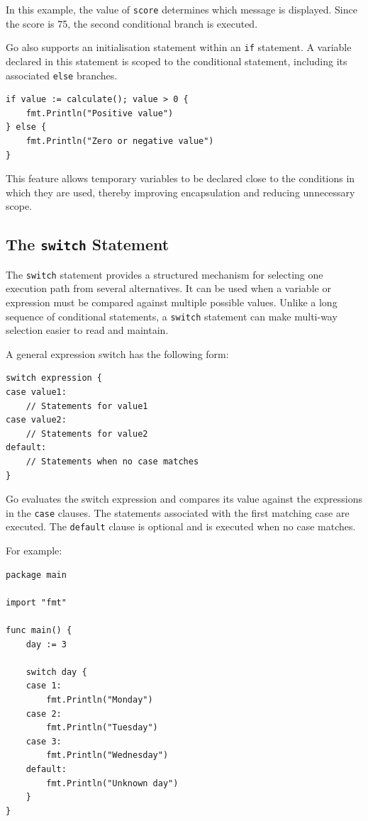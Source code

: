 In this example, the value of \texttt{score} determines which
message is displayed. Since the score is 75, the second
conditional branch is executed.

Go also supports an initialisation statement within an
\texttt{if} statement. A variable declared in this statement
is scoped to the conditional statement, including its
associated \texttt{else} branches.

\begin{lstlisting}
if value := calculate(); value > 0 {
    fmt.Println("Positive value")
} else {
    fmt.Println("Zero or negative value")
}
\end{lstlisting}

This feature allows temporary variables to be declared close
to the conditions in which they are used, thereby improving
encapsulation and reducing unnecessary scope.

\subsection{The \texttt{switch} Statement}

The \texttt{switch} statement provides a structured mechanism
for selecting one execution path from several alternatives.
It can be used when a variable or expression must be compared
against multiple possible values. Unlike a long sequence of
conditional statements, a \texttt{switch} statement can make
multi-way selection easier to read and maintain.

A general expression switch has the following form:

\begin{lstlisting}
switch expression {
case value1:
    // Statements for value1
case value2:
    // Statements for value2
default:
    // Statements when no case matches
}
\end{lstlisting}

Go evaluates the switch expression and compares its value
against the expressions in the \texttt{case} clauses. The
statements associated with the first matching case are
executed. The \texttt{default} clause is optional and is
executed when no case matches.

For example:

\begin{lstlisting}
package main

import "fmt"

func main() {
    day := 3

    switch day {
    case 1:
        fmt.Println("Monday")
    case 2:
        fmt.Println("Tuesday")
    case 3:
        fmt.Println("Wednesday")
    default:
        fmt.Println("Unknown day")
    }
}
\end{lstlisting}

